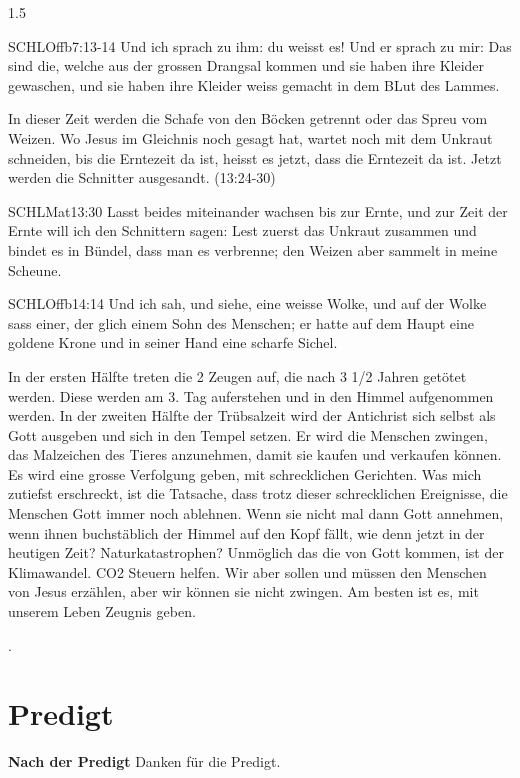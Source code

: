\documentclass[14pt]{../../inc/mybib}
\begin{document}
\begin{spacing}{1.5}
\begin{block}
\begin{bibelbox}{SCHL}{Offb}{7:13-14}
            Und ich sprach zu ihm: du weisst es! Und er sprach zu mir: Das sind die, welche aus der grossen Drangsal kommen und sie haben ihre Kleider gewaschen, und sie haben ihre Kleider weiss gemacht in dem BLut des Lammes.
        \end{bibelbox}
        In dieser Zeit werden die Schafe von den Böcken getrennt oder das Spreu vom Weizen. Wo Jesus im Gleichnis noch gesagt hat, wartet noch mit dem Unkraut schneiden, bis die Erntezeit da ist, heisst es jetzt, dass die Erntezeit da ist. Jetzt werden die Schnitter ausgesandt. (13:24-30)
         \begin{bibelbox}{SCHL}{Mat}{13:30}
            Lasst beides miteinander wachsen bis zur Ernte, und zur Zeit der Ernte will ich den Schnittern sagen: Lest zuerst das Unkraut zusammen und bindet es in Bündel, dass man es verbrenne; den Weizen aber sammelt in meine Scheune.
        \end{bibelbox}
         \begin{bibelbox}{SCHL}{Offb}{14:14}
            Und ich sah, und siehe, eine weisse Wolke, und auf der Wolke sass einer, der glich einem Sohn des Menschen; er hatte auf dem Haupt eine goldene Krone und in seiner Hand eine scharfe Sichel.
        \end{bibelbox}
        In der ersten Hälfte treten die 2 Zeugen auf, die nach 3 1/2 Jahren getötet werden. Diese werden am 3. Tag auferstehen und in den Himmel aufgenommen werden. In der zweiten Hälfte der Trübsalzeit wird der Antichrist sich selbst als Gott ausgeben und sich in den Tempel setzen. Er wird die Menschen zwingen, das Malzeichen des Tieres anzunehmen, damit sie kaufen und verkaufen können. Es wird eine grosse Verfolgung geben, mit schrecklichen Gerichten. Was mich zutiefst erschreckt, ist die Tatsache, dass trotz dieser schrecklichen Ereignisse, die Menschen Gott immer noch ablehnen.
        Wenn sie nicht mal dann Gott annehmen, wenn ihnen buchstäblich der Himmel auf den Kopf fällt, wie denn jetzt in der heutigen Zeit? Naturkatastrophen? Unmöglich das die von Gott kommen, ist der Klimawandel. CO2 Steuern helfen. Wir aber sollen und müssen den Menschen von Jesus erzählen, aber wir können sie nicht zwingen. Am besten ist es, mit unserem Leben Zeugnis geben. 
        
    \end{block}
    .
\end{spacing}
\section{Predigt}
\textbf{Nach der Predigt}\newline
Danken für die Predigt.
\end{document}
